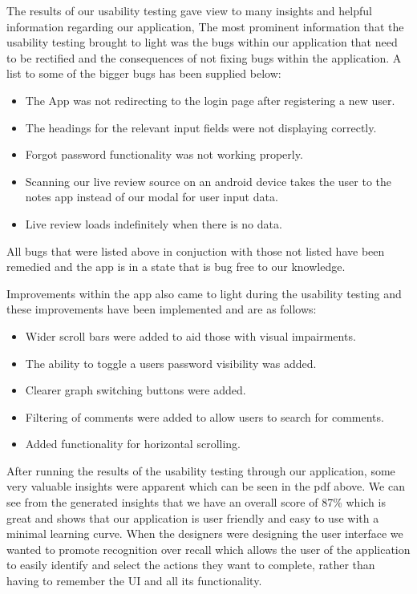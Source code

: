 \documentclass[12pt]{article}
\begin{document}
The results of our usability testing gave view to many insights and helpful information regarding our application, The most prominent information that the usability testing brought to light was the bugs within our application that need to be rectified and the consequences of not fixing bugs within the application. 
A list to some of the bigger bugs has been supplied below:
\begin{itemize}
    \item The App was not redirecting to the login page after registering a new user.
    \item The headings for the relevant input fields were not displaying correctly.
    \item Forgot password functionality was not working properly.
    \item Scanning our live review source on an android device takes the user to the notes app instead of our modal for user input data.
    \item Live review loads indefinitely when there is no data.
\end{itemize}
All bugs that were listed above in conjuction with those not listed have been remedied and the app is in a state that is bug free to our knowledge.
\par
Improvements within the app also came to light during the usability testing and these improvements have been implemented and are as follows:
\begin{itemize}
    \item Wider scroll bars were added to aid those with visual impairments.
    \item The ability to toggle a users password visibility was added.
    \item Clearer graph switching buttons were added.
    \item Filtering of comments were added to allow users to search for comments.
    \item Added functionality for horizontal scrolling.
\end{itemize}
After running the results of the usability testing through our application, some very valuable insights were apparent which can be seen in the pdf above.
We can see from the generated insights that we have an overall score of 87\% which is great and shows that our application is user friendly and easy to use with a minimal learning curve. When the designers were designing the user interface we wanted to promote recognition over recall which allows the user of the application to easily identify and select the actions they want to complete, rather than having to remember the UI and all its functionality.
\end{document}
